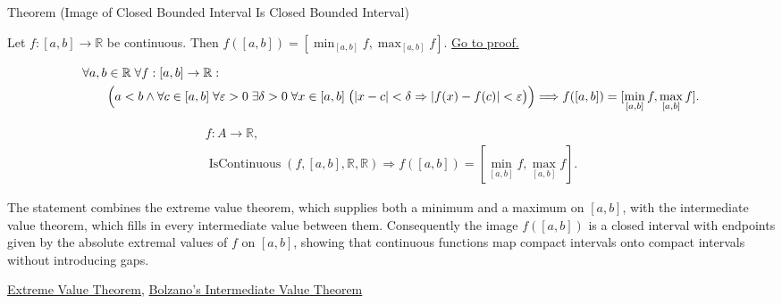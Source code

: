 \begin{theorembox}{Theorem (Image of Closed Bounded Interval Is Closed Bounded Interval)}
\begin{theorem}
\label{thm:image-of-closed-bounded-interval}
Let $f:[a,b]\to\mathbb{R}$ be continuous. Then $f([a,b])=[\min_{[a,b]} f,\max_{[a,b]} f]$.
\hyperref[prf:image-of-closed-bounded-interval]{Go to proof.}
\end{theorem}
\end{theorembox}

\begin{remark*}
\[
\begin{aligned}
&\forall a,b\in\mathbb{R}\;\forall f:[a,b]\to\mathbb{R}:\\
&\qquad
\Bigl(a<b \land
\forall c\in[a,b]\;\forall \varepsilon>0\;\exists \delta>0\;\forall x\in[a,b]\;
\bigl(|x-c|<\delta\Rightarrow |f(x)-f(c)|<\varepsilon\bigr)\Bigr)
\Longrightarrow
f([a,b])=[\min_{[a,b]} f,\max_{[a,b]} f].
\end{aligned}
\]
\end{remark*}

\begin{remark*}
\[
\begin{aligned}
  f\colon A\to\mathbb{R},\\
\operatorname{IsContinuous}(f,[a,b],\mathbb{R},\mathbb{R}) \Longrightarrow f([a,b])=[\min_{[a,b]} f,\max_{[a,b]} f].
\end{aligned}
\]
\end{remark*}

\begin{remark*}[Interpretation]
The statement combines the extreme value theorem, which supplies both a minimum and a maximum on $[a,b]$, with the intermediate value theorem, which fills in every intermediate value between them. Consequently the image $f([a,b])$ is a closed interval with endpoints given by the absolute extremal values of $f$ on $[a,b]$, showing that continuous functions map compact intervals onto compact intervals without introducing gaps.
\end{remark*}

\begin{dependencies}
\hyperref[thm:extreme-value-theorem]{Extreme Value Theorem},
\hyperref[thm:bolzano-intermediate-value]{Bolzano's Intermediate Value Theorem}
\end{dependencies}

